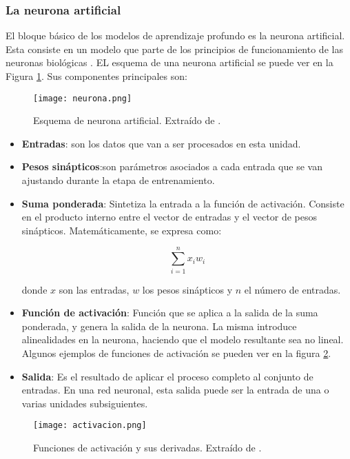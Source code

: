 \subsubsection{La neurona artificial}
El bloque básico de los modelos de aprendizaje profundo es la neurona artificial. Esta consiste en un modelo que parte de los principios de funcionamiento de las neuronas biológicas \cite{neurona}. EL esquema de una neurona artificial se puede ver en la Figura \ref{fig:neurona}. Sus componentes principales son: 

\begin{figure}[H]
  \centering{}
  \texttt{[image: neurona.png]}
  \caption{Esquema de neurona artificial. Extraído de \cite{dragon}.}
  \label{fig:neurona}
\end{figure}

\begin{itemize}
    \item \textbf{Entradas}: son los datos que van a ser procesados en esta unidad.
    \item \textbf{Pesos sinápticos}:son parámetros asociados a cada entrada que se van ajustando durante la etapa de entrenamiento. 
    
    \item \textbf{Suma ponderada}: Sintetiza la entrada a la función de activación. Consiste en el producto interno entre el vector de entradas y el vector de pesos sinápticos. Matemáticamente, se expresa como:
    
    \begin{equation}
\label{eqn:suma_ponderada}
	\sum_{i=1}^{n}x_{i}w_{i}
\end{equation}
    
    donde $x$ son las entradas, $w$ los pesos sinápticos y $n$ el número de entradas.
    \item \textbf{Función de activación}: Función que se aplica a la salida de la suma ponderada, y genera la salida de la neurona. La misma introduce alinealidades en la neurona, haciendo que el modelo resultante sea no lineal. Algunos ejemplos de funciones de activación se pueden ver en la figura \ref{fig:activación}. 
    
    \item \textbf{Salida}: Es el resultado de aplicar el proceso completo al conjunto de entradas. En una red neuronal, esta salida puede ser la entrada de una o varias unidades subsiguientes. 
\end{itemize}


\begin{figure}[H]
  \centering{}
  \texttt{[image: activacion.png]}
  \caption{Funciones de activación y sus derivadas. Extraído de \cite{lagartija}.}
  \label{fig:activación}
\end{figure}

